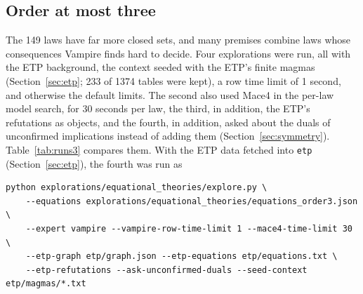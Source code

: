 \documentclass[11pt,a4paper]{article}
\theoremstyle{definition}
\theoremstyle{remark}
\newcommand{\code}[1]{\texttt{#1}}
\begin{document}
\subsection{Order at most three}

The 149 laws have far more closed sets, and many premises combine laws whose consequences Vampire finds hard to decide. Four explorations were run, all with the ETP background, the context seeded with the ETP's finite magmas (Section~\ref{sec:etp}; 233 of 1374 tables were kept), a row time limit of 1 second, and otherwise the default limits. The second also used Mace4 in the per-law model search, for 30 seconds per law, the third, in addition, the ETP's refutations as objects, and the fourth, in addition, asked about the duals of unconfirmed implications instead of adding them (Section~\ref{sec:symmetry}). Table~\ref{tab:runs3} compares them. With the ETP data fetched into \code{etp} (Section~\ref{sec:etp}), the fourth was run as
\begin{Verbatim}
python explorations/equational_theories/explore.py \
    --equations explorations/equational_theories/equations_order3.json \
    --expert vampire --vampire-row-time-limit 1 --mace4-time-limit 30 \
    --etp-graph etp/graph.json --etp-equations etp/equations.txt \
    --etp-refutations --ask-unconfirmed-duals --seed-context etp/magmas/*.txt
\end{Verbatim}
\end{document}
